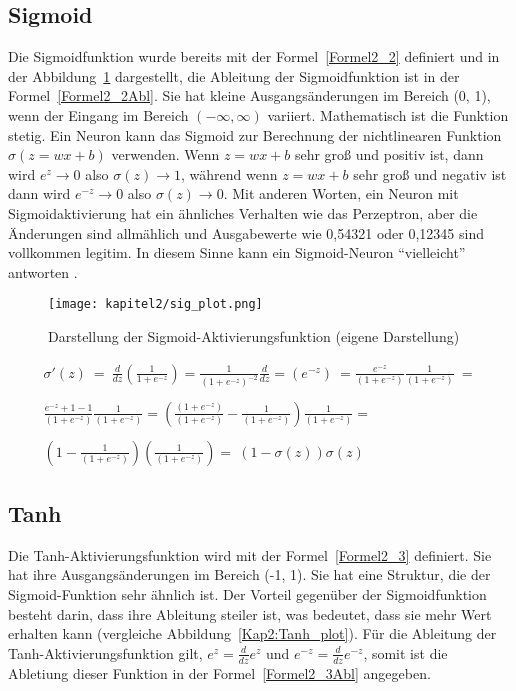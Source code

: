 \subsection{Sigmoid}
Die Sigmoidfunktion wurde bereits mit der Formel~\ref{Formel2_2} definiert und in der Abbildung~\ref{Kap2:Sigmoid_plot} dargestellt, die Ableitung der Sigmoidfunktion ist in der Formel~\ref{Formel2_2Abl}. Sie hat kleine Ausgangsänderungen im Bereich (0, 1), wenn der Eingang im Bereich $(-\infty, \infty)$ variiert. Mathematisch ist die Funktion stetig. Ein Neuron kann das Sigmoid zur Berechnung der nichtlinearen Funktion $\sigma(z = wx + b)$ verwenden.
Wenn $z = wx + b$ sehr groß und positiv ist, dann wird $e^z \rightarrow 0$ also $\sigma(z) \rightarrow 1$, während wenn $z = wx + b$ sehr groß und negativ ist dann wird $e^{-z} \rightarrow 0$ also $\sigma(z) \rightarrow 0$. Mit anderen Worten, ein Neuron mit Sigmoidaktivierung hat ein ähnliches Verhalten wie das Perzeptron, aber die Änderungen sind allmählich und Ausgabewerte wie 0,54321 oder 0,12345 sind vollkommen legitim. In diesem Sinne kann ein Sigmoid-Neuron \enquote{vielleicht} antworten \cite*[10]{AntonioGuili;AmitaKapoor;SujitPal2019}.
\begin{figure}[H]
  \centering
  \texttt{[image: kapitel2/sig\_plot.png]}
  \caption[Darstellung der Sigmoid-Aktivierungsfunktion]{Darstellung der Sigmoid-Aktivierungsfunktion (eigene Darstellung)}
  \label{Kap2:Sigmoid_plot}
\end{figure}


\begin{equation} \label{Formel2_2Abl}
  \begin{array}{ c }
    \sigma '(z)\ =\ \frac{d}{dz}\left(\frac{1}{1+e^{-z}}\right) =\frac{1}{\left( 1+e^{-z}\right)^{-2}}\frac{d}{dz} =\left( e^{-z}\right) \ =\frac{e^{-z}}{\left( 1+e^{-z}\right)}\frac{1}{\left( 1+e^{-z}\right)} \ =  \\
    \\
    \frac{e^{-z} +1-1}{\left( 1+e^{-z}\right)}\frac{1}{\left( 1+e^{-z}\right)} =\left(\frac{\left( 1+e^{-z}\right)}{\left( 1+e^{-z}\right)} -\frac{1}{\left( 1+e^{-z}\right)}\right)\frac{1}{\left( 1+e^{-z}\right)} = \\
    \\
    \left( 1-\frac{1}{\left( 1+e^{-z}\right)}\right)\left(\frac{1}{\left( 1+e^{-z}\right)}\right) =\ (1-\sigma (z))\sigma (z)
  \end{array}
\end{equation}

\subsection{Tanh}
Die Tanh-Aktivierungsfunktion wird mit der Formel~\ref{Formel2_3} definiert. Sie hat ihre Ausgangsänderungen im Bereich (-1, 1). Sie hat eine Struktur, die der Sigmoid-Funktion sehr ähnlich ist. Der Vorteil gegenüber der Sigmoidfunktion besteht darin, dass ihre Ableitung steiler ist, was bedeutet, dass sie mehr Wert erhalten kann (vergleiche Abbildung~\ref{Kap2:Tanh_plot}). Für die Ableitung der Tanh-Aktivierungsfunktion gilt, $e^z = \frac{d}{dz}e^z$ und $e^{-z} = \frac{d}{dz}e^{-z}$, somit ist die Abletiung dieser Funktion in der Formel~\ref{Formel2_3Abl} angegeben.

